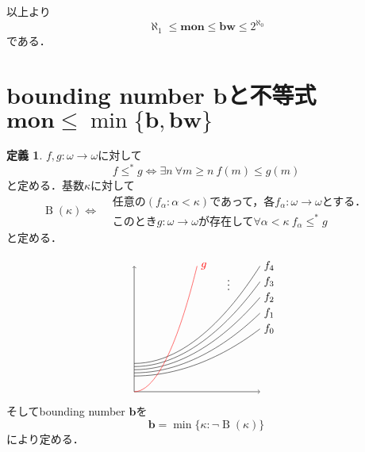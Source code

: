 \documentclass[uplatex,dvipdfmx]{jsarticle}
\newcommand{\B}{\operatorname{B}}
\theoremstyle{definition}
\newtheorem*{defi*}{定義}
\theoremstyle{named}
\begin{document}
以上より
\[
\aleph_1 \le \mathbf{mon} \le \mathbf{bw} \le 2^{\aleph_0}
\]
である．

\section{bounding number $\mathbf{b}$と不等式$\mathbf{mon} \le \min\{\mathbf{b}, \mathbf{bw}\}$}

\begin{framed}
\begin{defi*}
$f, g : \omega \to \omega$に対して
\[
f \le^\ast g \iff \exists n\ \forall m \ge n\ f(m) \le g(m)
\]
と定める．基数$\kappa$に対して
\[
\B(\kappa) \iff \begin{aligned}
&\text{任意の$(f_\alpha : \alpha < \kappa)$であって，各$f_\alpha: \omega \to \omega$とする．} \\
&\text{このとき$g: \omega \to \omega$が存在して$\forall \alpha < \kappa\ f_\alpha \le^\ast g$}
\end{aligned}
\]
と定める．

\[
\begin{tikzpicture}
\draw[->] (0,0) -- (0,4);
\draw[->] (0,0) -- (4,0);
\draw (0,0.5) parabola bend (0,0.5) (4,2) node[right] {$f_0$};
\draw (0,0.6) parabola bend (0,0.6) (4,2.5) node[right] {$f_1$};
\draw (0,0.7) parabola bend (0,0.7) (4,3) node[right] {$f_2$};
\draw (0,0.8) parabola bend (0,0.8) (4,3.5) node[right] {$f_3$};
\draw (0,0.9) parabola bend (0,0.9) (4,4) node[right] {$f_4$};
\node at (3,3.5) {$\vdots$};
\draw[red] (0,0) parabola bend (0,0) (2,4) node[right] {$g$};
\end{tikzpicture}
\]


そしてbounding number $\mathbf{b}$を
\[
\mathbf{b} = \min \{ \kappa : \neg \B(\kappa) \}
\]
により定める．
\end{defi*}
\end{framed}
\end{document}

